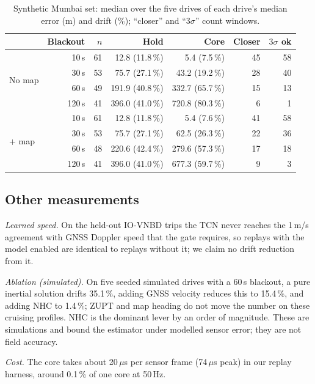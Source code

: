 \documentclass[conference]{IEEEtran}
\begin{document}
\begin{table}[t]
\centering
\caption{Synthetic Mumbai set: median over the five drives of each drive's
median error (m) and drift (\%); ``closer'' and ``$3\sigma$'' count windows.}
\label{tab:synth}
\setlength{\tabcolsep}{3pt}
\begin{tabular}{@{}lrrrrrr@{}}
\toprule
 & Blackout & $n$ & Hold & Core & Closer & $3\sigma$ ok\\
\midrule
\multirow{4}{*}{No map} & 10\,s & 61 & 12.8 (11.8\,\%) & 5.4 (7.5\,\%) & 45 & 58\\
 & 30\,s & 53 & 75.7 (27.1\,\%) & 43.2 (19.2\,\%) & 28 & 40\\
 & 60\,s & 49 & 191.9 (40.8\,\%) & 332.7 (65.7\,\%) & 15 & 13\\
 & 120\,s & 41 & 396.0 (41.0\,\%) & 720.8 (80.3\,\%) & 6 & 1\\
\midrule
\multirow{4}{*}{+ map} & 10\,s & 61 & 12.8 (11.8\,\%) & 5.4 (7.6\,\%) & 41 & 58\\
 & 30\,s & 53 & 75.7 (27.1\,\%) & 62.5 (26.3\,\%) & 22 & 36\\
 & 60\,s & 48 & 220.6 (42.4\,\%) & 279.6 (57.3\,\%) & 17 & 18\\
 & 120\,s & 41 & 396.0 (41.0\,\%) & 677.3 (59.7\,\%) & 9 & 3\\
\bottomrule
\end{tabular}
\end{table}

\subsection{Other measurements}
\emph{Learned speed.} On the held-out IO-VNBD trips the TCN never reaches the
1\,m/s agreement with GNSS Doppler speed that the gate requires, so replays
with the model enabled are identical to replays without it; we claim no drift
reduction from it.

\emph{Ablation (simulated).} On five seeded simulated drives with a 60\,s
blackout, a pure inertial solution drifts 35.1\,\%, adding GNSS velocity
reduces this to 15.4\,\%, and adding NHC to 1.4\,\%; ZUPT and map heading do
not move the number on these cruising profiles. NHC is the dominant lever by an
order of magnitude. These are simulations and bound the estimator under
modelled sensor error; they are not field accuracy.

\emph{Cost.} The core takes about 20\,$\mu$s per sensor frame (74\,$\mu$s
peak) in our replay harness, around 0.1\,\% of one core at 50\,Hz.
\end{document}
